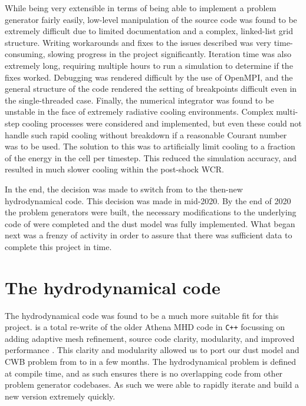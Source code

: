 While being very extensible in terms of being able to implement a problem generator fairly easily, low-level manipulation of the \mg{} source code was found to be extremely difficult due to limited documentation and a complex, linked-list grid structure.
Writing workarounds and fixes to the issues described was very time-consuming, slowing progress in the project significantly.
Iteration time was also extremely long, requiring multiple hours to run a simulation to determine if the fixes worked.
Debugging was rendered difficult by the use of OpenMPI, and the general structure of the code rendered the setting of breakpoints difficult even in the single-threaded case.
Finally, the numerical integrator was found to be unstable in the face of extremely radiative cooling environments.
Complex multi-step cooling processes were considered and implemented, but even these could not handle such rapid cooling without breakdown if a reasonable Courant number was to be used.
The solution to this was to artificially limit cooling to a fraction of the energy in the cell per timestep.
This reduced the simulation accuracy, and resulted in much slower cooling within the post-shock WCR.

In the end, the decision was made to switch from \mg{} to the then-new \athena{} hydrodynamical code.
This decision was made in mid-2020.
By the end of 2020 the problem generators were built, the necessary modifications to the underlying code of \athena{} were completed and the dust model was fully implemented.
What began next was a frenzy of activity in order to assure that there was sufficient data to complete this project in time.

\section{The \athena{} hydrodynamical code}
\label{sec:athenapp}

The  hydrodynamical code was found to be a much more suitable fit for this project.
\athena{} is a total re-write of the older Athena MHD code in \texttt{C++} focussing on adding adaptive mesh refinement, source code clarity, modularity, and improved performance \parencite{stoneAthenaAdaptiveMesh2020}.
This clarity and modularity allowed us to port our dust model and CWB problem from \mg{} to \athena{} in a few months.
The hydrodynamical problem is defined at compile time, and as such ensures there is no overlapping code from other problem generator codebases.
As such we were able to rapidly iterate and build a new version extremely quickly.

